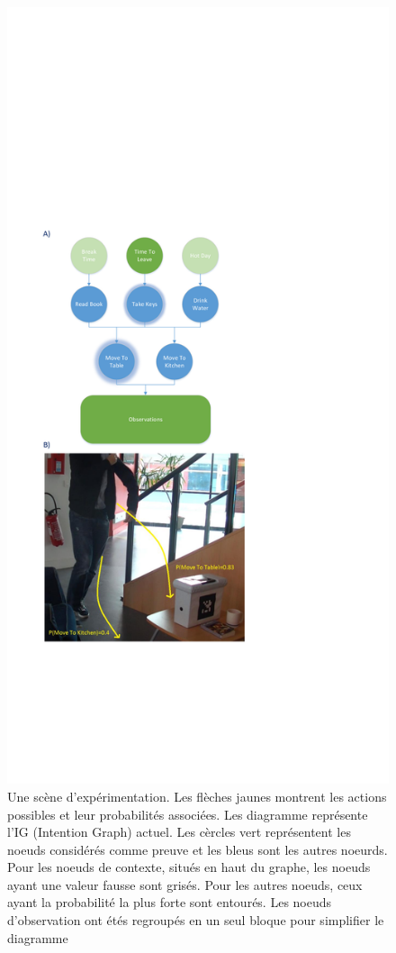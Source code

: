 \documentclass[a4paper,11pt,twoside]{StyleThese}
\begin{document}
 \begin{figure}[h!]
	\centering
	\includegraphics[trim={2cm 11cm 11cm 17cm},clip,scale=0.56]{img/cookieScenario.pdf}
	\caption{Une scène d'expérimentation. Les flèches jaunes montrent les actions possibles et leur probabilités associées. Les diagramme représente l'IG (Intention Graph) actuel. Les cèrcles vert représentent les noeuds considérés comme preuve et les bleus sont les autres noeurds. Pour les noeuds de contexte, situés en haut du graphe, les noeuds ayant une valeur fausse sont grisés. Pour les autres noeuds, ceux ayant la probabilité la plus forte sont entourés. Les noeuds d'observation ont étés regroupés en un seul bloque pour simplifier le diagramme}
	\label{fig:intention_graph}
   	\vspace{-20pt}
\end{figure}
\end{document}
